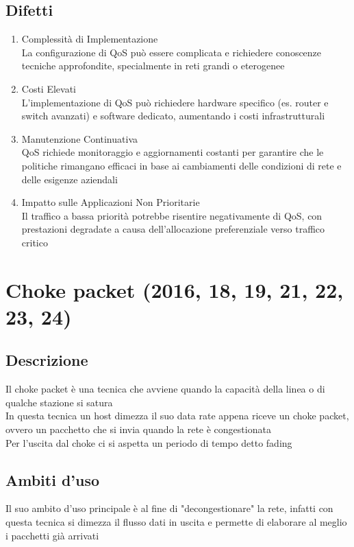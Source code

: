 \documentclass[10pt,oneside,a4paper]{article}
\begin{document}
\subsection{Difetti}
\begin{enumerate}
\item Complessità di Implementazione\\
La configurazione di QoS può essere complicata e richiedere conoscenze tecniche approfondite, specialmente in reti grandi o eterogenee
\item Costi Elevati\\
L'implementazione di QoS può richiedere hardware specifico (es. router e switch avanzati) e software dedicato, aumentando i costi infrastrutturali
\item Manutenzione Continuativa\\
QoS richiede monitoraggio e aggiornamenti costanti per garantire che le politiche rimangano efficaci in base ai cambiamenti delle condizioni di rete e delle esigenze aziendali
\item Impatto sulle Applicazioni Non Prioritarie\\
Il traffico a bassa priorità potrebbe risentire negativamente di QoS, con prestazioni degradate a causa dell'allocazione preferenziale verso traffico critico
\end{enumerate}
\section{Choke packet (2016, 18, 19, 21, 22, 23, 24)}
\subsection{Descrizione}
Il choke packet è una tecnica che avviene quando la capacità della linea o di qualche stazione si satura\\
In questa tecnica un host dimezza il suo data rate appena riceve un choke packet, ovvero un pacchetto che si invia quando la rete è congestionata\\
Per l'uscita dal choke ci si aspetta un periodo di tempo detto fading
\subsection{Ambiti d'uso}
Il suo ambito d'uso principale è al fine di "decongestionare" la rete, infatti con questa tecnica si dimezza il flusso dati in uscita e permette di elaborare al meglio i pacchetti già arrivati
\end{document}
